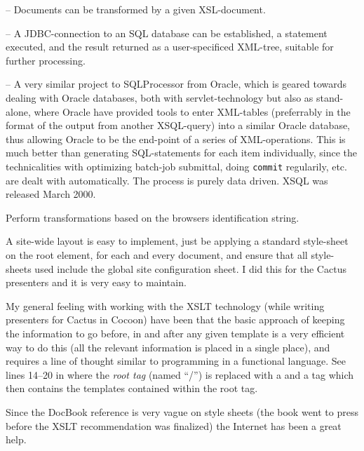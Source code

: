 \begin{description}
\item[XSLT] -- Documents can be transformed by a given XSL-document.
  
\item[SQLProcessor] -- A JDBC-connection to an SQL database can be
  established, a statement executed, and the result returned as a
  user-specificed XML-tree, suitable for further processing.
  
\item[XSQL] -- A very similar project to SQLProcessor from Oracle,
  which is geared towards dealing with Oracle databases, both with
  servlet-technology but also as stand-alone, where Oracle have
  provided tools to enter XML-tables (preferrably in the format of the
  output from another XSQL-query) into a similar Oracle database, thus
  allowing Oracle to be the end-point of a series of XML-operations.
  This is much better than generating SQL-statements for each item
  individually, since the technicalities with optimizing batch-job
  submittal, doing \texttt{commit} regularily, etc. are dealt with
  automatically.  The process is purely data driven.   XSQL was
  released March 2000.

\item Perform transformations based on the browsers identification
  string.
\end{description}

A site-wide layout is easy to implement, just be applying a standard
style-sheet on the root element, for each and every document, and
ensure that all style-sheets used include the global site
configuration sheet.  I did this for the Cactus presenters and it is
very easy to maintain.

My general feeling with working with the XSLT technology (while
writing presenters for Cactus in Cocoon) have been that the basic
approach of keeping the information to go before, in and after any
given template is a very efficient way to do this (all the relevant
information is placed in a single place), and requires a line of
thought similar to programming in a functional language.  See lines
14--20 in  where the \textit{root
  tag} (named ``/'') is replaced with a  and a 
tag which then contains the templates contained within the root tag.

Since the DocBook reference is very vague on style sheets (the book
went to press before the XSLT recommendation was finalized) the
Internet has been a great help.

